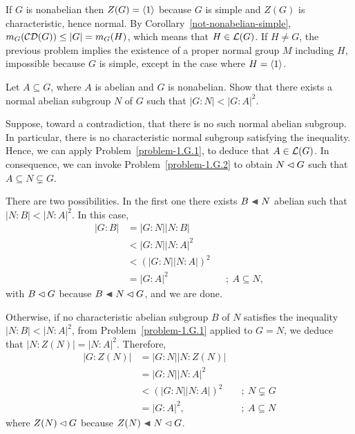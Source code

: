 \begin{solution} If $G$ is nonabelian then $Z(G)=\langle1\rangle$ because $G$ is simple and $Z(G)$ is characteristic, hence normal. By Corollary~\ref{not-nonabelian-simple}, $m_G(\operatorname{{\cal CD}}(G)) \le |G|=m_G(H)$, which means that $H\in{\cal L}(G)$. If $H\ne G$, the previous problem implies the existence of a proper normal group $M$ including $H$, impossible because $G$ is simple, except in the case where $H=\langle1\rangle$.  \end{solution}

\begin{probl}
    Let\/ $A \subseteq G$, where\/ $A$ is abelian and\/ $G$ is nonabelian. Show that there exists a normal abelian subgroup\/ $N$ of\/ $G$ such that\/ $|G:N|<|G:A|^2$.
\end{probl}

\begin{solution} Suppose, toward a contradiction, that there is no such normal abelian subgroup. In particular, there is no characteristic normal subgroup satisfying the inequality. Hence, we can apply Problem~\ref{problem-1.G.1}, to deduce that $A\in{\cal L}(G)$. In consequence, we can invoke Problem~\ref{problem-1.G.2} to obtain $N\lhd G$ such that $A\subseteq N\varsubsetneq G$.

There are two possibilities. In the first one there exists $B\ch N$ abelian such that $|N:B|<|N:A|^2$. In this case,
\begin{align*}
    |G:B| &= |G:N||N:B|\\
        &< |G:N||N:A|^2\\
        &< (|G:N||N:A|)^2\\
        &= |G:A|^2  &&;\ A\subseteq N,
\end{align*}
with $B\lhd G$ because $B\ch N\normal G$, and we are done.

Otherwise, if no characteristic abelian subgroup $B$ of $N$ satisfies the inequality $|N:B|<|N:A|^2$, from Problem~\ref{problem-1.G.1} applied to $G=N$, we deduce that $|N:Z(N)|=|N:A|^2$. Therefore,
\begin{align*}
    |G:Z(N)|&=|G:N||N:Z(N)|\\
        &= |G:N||N:A|^2 \\
        &< (|G:N||N:A|)^2   &&;\ N\varsubsetneq G\\
        &= |G:A|^2,  &&;\ A\subseteq N
\end{align*}
where $Z(N)\lhd G$ because $Z(N)\ch N\normal G$.  \end{solution}
